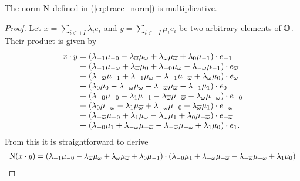 \begin{lemma}
	\label{lemma:norm_multiplicative}
	The norm $\mathord{\mathrm{N}}$ defined in (\ref{eq:trace_norm}) is multiplicative.
\end{lemma}

\begin{proof}
	Let $x = \sum_{i \in \pm I} \lambda_i e_i$ and
	$y = \sum_{i \in \pm I} \mu_i e_i$ be two arbitrary elements of $\mathbb{O}$. Their product is
	given by
	\begin{equation*}
		\begin{array}{r@{\;}c@{\;}l}
			x \cdot y & = & (\lambda_{-1} \mu_{-0} - \lambda_{\bar{\omega}} \mu_{\omega}
				+ \lambda_{\omega} \mu_{\bar{\omega}} + \lambda_0 \mu_{-1}) \cdot e_{-1} \\
							
				&+ &   (\lambda_{-1} \mu_{-\omega} + \lambda_{\bar{\omega}} \mu_0 + 
			\lambda_{-0} \mu_{\omega} - \lambda_{-\omega} \mu_{-1}) \cdot e_{\bar{\omega}}  \\
					
				&+ &   (\lambda_{-\bar{\omega}} \mu_{-1} + \lambda_{-1} \mu_{\omega} - 
						\lambda_{-1} \mu_{-\bar{\omega}} + \lambda_{\omega} \mu_0) \cdot e_{\omega} \\
					
				&+ &   (\lambda_0 \mu_0 - \lambda_{-\omega} \mu_{\omega} - 
				\lambda_{-\bar{\omega}} \mu_{\bar{\omega}} - \lambda_{-1} \mu_1) \cdot e_0 \\
						
				&+ &   (\lambda_{-0} \mu_{-0} - \lambda_1 \mu_{-1} - 
	\lambda_{\bar{\omega}} \mu_{-\bar{\omega}}-\lambda_{\omega}\mu_{-\omega}) \cdot e_{-0} \\
				
				&+ &   (\lambda_0 \mu_{-\omega} - \lambda_1 \mu_{\bar{\omega}} + \lambda_{-\omega}
			\mu_{-0} + \lambda_{\bar{\omega}} \mu_1) \cdot e_{-\omega} \\
				
				&+ &   (\lambda_{-\bar{\omega}} \mu_{-0} + \lambda_1 \mu_{\omega} - 
				\lambda_{\omega} \mu_1 + 
				\lambda_0 \mu_{-\bar{\omega}}) \cdot e_{-\bar{\omega}} \\
			
				&+ &   (\lambda_{-0} \mu_1 + \lambda_{-\omega} \mu_{-\bar{\omega}} - 
			\lambda_{-\bar{\omega}} \mu_{-\omega} + \lambda_1 \mu_0) \cdot e_1 .
		\end{array}
	\end{equation*}
	From this it is straightforward to derive
	\begin{equation*}
		\begin{array}{r@{\;}c@{\;}l}
			\NN(x\cdot y) & = &
						(\lambda_{-1} \mu_{-0} - \lambda_{\bar{\omega}} \mu_{\omega}
				+ \lambda_{\omega} \mu_{\bar{\omega}} + \lambda_0 \mu_{-1})\cdot
					(\lambda_{-0} \mu_1 + \lambda_{-\omega} \mu_{-\bar{\omega}} - 
			\lambda_{-\bar{\omega}} \mu_{-\omega} + \lambda_1 \mu_0) \\
			

\end{array}
\end{equation*}
\end{proof}

